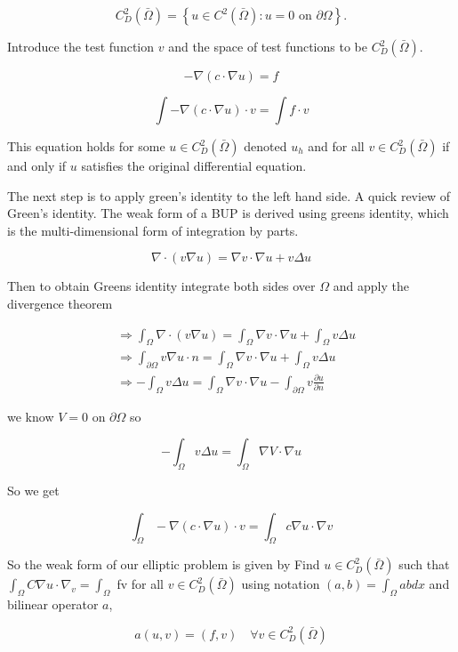 \documentclass[12pt, oneside]{book}
\begin{document}
$$
C_{D}^{2}(\bar{\Omega})=\left\{u \in C^{2}(\bar{\Omega}): u=0 \text { on } \partial \Omega\right\} .
$$

Introduce the test function $v$ and the space of test functions to be $C_{D}^{2}(\bar{\Omega})$.

$$
-\nabla(c \cdot \nabla u)=f
$$

$$
\int-\nabla(c \cdot \nabla u) \cdot v=\int f \cdot v
$$

This equation holds for some $u \in C_{D}^{2}(\bar{\Omega})$ denoted $u_{h}$ and for all $v \in C_{D}^{2}(\bar{\Omega})$ if and only if $u$ satisfies the original differential equation.

The next step is to apply green's identity to the left hand side. A quick review of Green's identity. The weak form of a BUP is derived using greens identity, which is the multi-dimensional form of integration by parts.

$$
\nabla \cdot(v \nabla u)=\nabla v \cdot \nabla u+v \Delta u
$$

Then to obtain Greens identity integrate both sides over $\Omega$ and apply the divergence theorem

$$
\begin{aligned}
& \Rightarrow \int_{\Omega} \nabla \cdot(v \nabla u)=\int_{\Omega} \nabla v \cdot \nabla u+\int_{\Omega} v \Delta u \\
& \Rightarrow \int_{\partial \Omega} v \nabla u \cdot n=\int_{\Omega} \nabla v \cdot \nabla u+\int_{\Omega} v \Delta u \\
& \Rightarrow-\int_{\Omega} v \Delta u=\int_{\Omega} \nabla v \cdot \nabla u-\int_{\partial \Omega} v \frac{\partial u}{\partial n}
\end{aligned}
$$

we know $V=0$ on $\partial \Omega$ so

$$
-\int_{\Omega} v \Delta u=\int_{\Omega} \nabla V \cdot \nabla u
$$

So we get

$$
\int_{\Omega}-\nabla(c \cdot \nabla u) \cdot v=\int_{\Omega} c \nabla u \cdot \nabla v
$$

So the weak form of our elliptic problem is given by Find $u \in C_{D}^{2}(\bar{\Omega})$ such that $\int_{\Omega} C \nabla u \cdot \nabla_{v}=\int_{\Omega}$ fv for all $v \in C_{D}^{2}(\bar{\Omega})$ using notation $(a, b)=\int_{\Omega} a b d x$ and bilinear operator $a$,

$$
a(u, v)=(f, v) \quad \forall v \in C_{D}^{2}(\bar{\Omega})
$$
\end{document}
